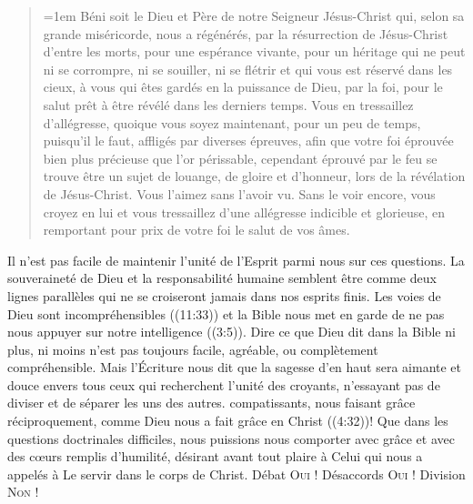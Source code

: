 \begin{quote}
\begin{digestpar}{}
\begin{pocketpar}{\emergencystretch=1em}
 \og Béni soit le Dieu et Père de notre Seigneur Jésus-Christ qui,
 selon sa grande miséricorde, nous a régénérés, par la résurrection
 de Jésus-Christ d'entre les morts, pour une espérance vivante,
 pour un héritage qui ne peut ni se corrompre, ni se souiller,
 ni se flétrir et qui vous est réservé dans les cieux,
 à vous qui êtes gardés en la puissance de Dieu, par la foi,
 pour le salut prêt à être révélé dans les derniers temps.
 Vous en tressaillez d'allégresse, quoique vous soyez maintenant,
 pour un peu de temps, puisqu'il le faut, affligés par diverses épreuves,
 afin que votre foi éprouvée \ocadr bien plus précieuse que l'or périssable,
 cependant éprouvé par le feu \fcadr{} se trouve être un sujet de louange,
 de gloire et d'honneur, lors de la révélation de Jésus-Christ.
 Vous l'aimez sans l'avoir vu. Sans le voir encore, vous croyez en lui
 et vous tressaillez d'une allégresse indicible et glorieuse,
 en remportant pour prix de votre foi le salut de vos âmes. \fg{}
\end{pocketpar}
\end{digestpar}
\end{quote}

\begin{digestpar}{}
\begin{pocketpar}{}
Il n'est pas facile de maintenir l'unité de l'Esprit parmi nous sur ces questions.
 La souveraineté de Dieu et la responsabilité humaine semblent être
 comme deux lignes parallèles qui ne se croiseront jamais dans nos esprits finis.
 Les voies de Dieu sont \og incompréhensibles \fg{} ((11:33))
 et la Bible nous met en garde de \og ne pas nous appuyer sur notre intelligence \fg{}
 ((3:5)).
 Dire ce que Dieu dit dans la Bible \ocadr ni plus, ni moins \fcadr{} n'est pas
 toujours facile, agréable, ou complètement compréhensible.
 Mais l'Écriture nous dit que la sagesse d'en haut sera aimante
 et douce envers tous ceux qui recherchent l'unité des croyants,
 n'essayant pas de diviser et de séparer les uns des autres.
 compatissants, nous faisant grâce réciproquement,
 comme Dieu nous a fait grâce en Christ ((4:32))!
 Que dans les questions doctrinales difficiles, nous puissions nous comporter
 avec grâce et avec des cœurs remplis d'humilité, désirant avant tout
 plaire à Celui qui nous a appelés à Le servir dans le corps de Christ.
 Débat \ocadr \textsc{Oui} !
 Désaccords \ocadr \textsc{Oui} ! \pocketlinebreak
 Division \ocadr \textsc{Non} !
\end{pocketpar}
\end{digestpar}

